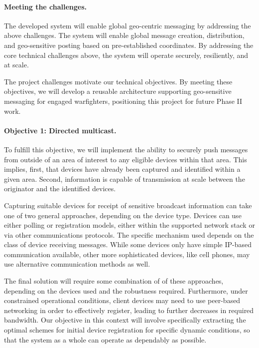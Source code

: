 \documentclass{sbir}
\begin{document}
\paragraph{Meeting the challenges.} The developed system will enable global geo-centric messaging by addressing the above challenges. The system will enable global message creation, distribution, and geo-sensitive posting based on pre-established coordinates. By addressing the core technical challenges above, the system will operate securely, resiliently, and at scale.

{The project challenges motivate our technical objectives. By meeting these objectives, we will develop a reusable architecture supporting geo-sensitive messaging for engaged warfighters, positioning this project for future Phase II work.}

\paragraph{Objective 1: Directed multicast.} To fulfill this objective, we will implement the ability to securely push messages from outside of an area of interest to any eligible devices within that area. This implies, first, that devices have already been captured and identified within a given area. Second, information is capable of transmission at scale between the originator and the identified devices.

Capturing suitable devices for receipt of sensitive broadcast information can take one of two general approaches, depending on the device type. Devices can use either polling or registration models, either within the supported network stack or via other communications protocols. The specific mechanism used depends on the class of device receiving messages. While some devices only have simple IP-based communication available, other more sophisticated devices, like cell phones, may use alternative communication methods as well. 

The final solution will require some combination of of these approaches, depending on the devices used and the robustness required. Furthermore, under constrained operational conditions, client devices may need to use peer-based networking in order to effectively register, leading to further decreases in required bandwidth. Our objective in this context will involve specifically extracting the optimal schemes for initial device registration for specific dynamic conditions, so that the system as a whole can operate as dependably as possible.
\end{document}
